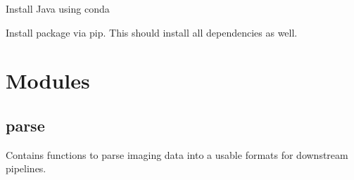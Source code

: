 \documentclass[a4paper,10pt,english,openany,oneside]{sphinxmanual}
\begin{document}
\sphinxAtStartPar
Install Java using conda

\begin{sphinxVerbatim}[commandchars=\\\{\}]
    
\end{sphinxVerbatim}

\sphinxAtStartPar
Install package via pip. This should install all dependencies as well.

\begin{sphinxVerbatim}[commandchars=\\\{\}]
  
\end{sphinxVerbatim}

\sphinxstepscope


\section{Modules}
\label{\detokenize{pages/modules:module-sparcstools.parse}}\label{\detokenize{pages/modules:modules}}\label{\detokenize{pages/modules::doc}}

\subsection{parse}
\label{\detokenize{pages/modules:parse}}
\sphinxAtStartPar
Contains functions to parse imaging data into a usable formats for downstream pipelines.
\end{document}
